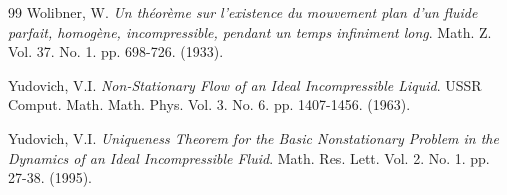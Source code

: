 \begin{thebibliography}{99}
Wolibner, W.
\textit{Un th\'eor\`eme sur l'existence du mouvement plan d'un fluide parfait,
homog\`ene, incompressible, pendant un temps infiniment long}.
Math. Z. Vol. 37. No. 1. pp. 698-726. (1933).

Yudovich, V.I.
\textit{Non-Stationary Flow of an Ideal Incompressible Liquid}.
USSR Comput. Math. Math. Phys. Vol. 3. No. 6. pp. 1407-1456. (1963).

Yudovich, V.I.
\textit{Uniqueness Theorem for the Basic Nonstationary Problem in the Dynamics of an
Ideal Incompressible Fluid}.
Math. Res. Lett. Vol. 2. No. 1. pp. 27-38. (1995).

\end{thebibliography}
